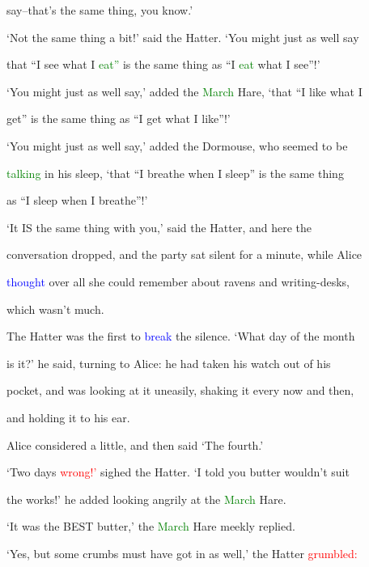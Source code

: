  say--that’s the same thing, you know.’



 ‘Not the same thing a bit!’ said the Hatter. ‘You might just as well say

 that “I see what I \textcolor{green}{eat”} is the same thing as “I \textcolor{green}{eat} what I see”!’



 ‘You might just as well say,’ added the \textcolor{green}{March} Hare, ‘that “I like what I

 get” is the same thing as “I get what I like”!’



 ‘You might just as well say,’ added the Dormouse, who seemed to be

 \textcolor{green}{talking} in his sleep, ‘that “I breathe when I sleep” is the same thing

 as “I sleep when I breathe”!’



 ‘It IS the same thing with you,’ said the Hatter, and here the

 conversation dropped, and the party sat silent for a minute, while Alice

 \textcolor{blue}{thought} over all she could remember about ravens and writing-desks,

 which wasn’t much.



 The Hatter was the first to \textcolor{blue}{break} the silence. ‘What day of the month

 is it?’ he said, turning to Alice: he had taken his \textcolor{BurntOrange}{watch} out of his

 pocket, and was looking at it uneasily, shaking it every now and then,

 and holding it to his ear.



 Alice considered a little, and then said ‘The fourth.’



 ‘Two days \textcolor{red}{wrong!’} sighed the Hatter. ‘I told you butter wouldn’t suit

 the works!’ he added looking angrily at the \textcolor{green}{March} Hare.



 ‘It was the BEST butter,’ the \textcolor{green}{March} Hare meekly replied.



 ‘Yes, but some crumbs must have got in as well,’ the Hatter \textcolor{red}{grumbled:}

